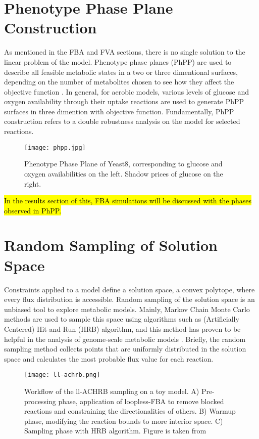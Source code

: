 \section{Phenotype Phase Plane Construction}

As mentioned in the FBA and FVA sections, there is no single solution to the linear problem of the model. Phenotype phase planes (PhPP) are used to describe all feasible metabolic states in a two or three dimentional surfaces, depending on the number of metabolites chosen to see how they affect the objective function \cite{edwards2002characterizing}. In general, for aerobic models, various levels of glucose and oxygen availability through their uptake reactions are used to generate PhPP surfaces in three dimention with objective function. Fundamentally, PhPP construction refers to a double robustness analysis on the model for selected reactions.

\begin{figure}[H]
\begin{center}
\texttt{[image: phpp.jpg]}
\end{center}
\caption[Phenotype Phase Plane of Yeast8]{Phenotype Phase Plane of Yeast8, corresponding to glucose and oxygen availabilities on the left. Shadow prices of glucose on the right.}
\label{fig:phpp}
\end{figure}

\hl{In the results section of this, FBA simulations will be discussed with the phases observed in PhPP.}


\section{Random Sampling of Solution Space}
Constraints applied to a model define a solution space, a convex polytope, where every flux distribution is accessible. Random sampling of the solution space is an unbiased tool to explore metabolic models. Mainly, Markov Chain Monte Carlo methods are used to sample this space using algorithms such as (Artificially Centered) Hit-and-Run (HRB) \cite{kiatsupaibul2011analysis, saa2016ll} algorithm, and this method has proven to be helpful in the analysis of genome-scale metabolic models \cite{schellenberger2009use}. Briefly, the random sampling method collects points that are uniformly distributed in the solution space and calculates the most probable flux value for each reaction.

\begin{figure}[H]
\begin{center}
\texttt{[image: ll-achrb.png]}
\end{center}
\caption[Workflow of the Loopless-ACHRB sampling on a toy model]{Workflow of the ll-ACHRB sampling on a toy model. A) Pre-processing phase, application of loopless-FBA to remove blocked reactions and constraining the directionalities of others. B) Warmup phase, modifying the reaction bounds to more interior space. C) Sampling phase with HRB algorithm. Figure is taken from \cite{saa2016ll}}
\label{fig:achrb}
\end{figure}

